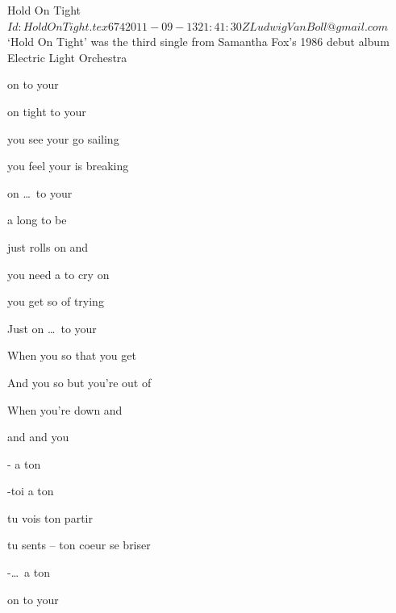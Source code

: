 \begin{SBSong}{Hold On Tight}
  {$Id: HoldOnTight.tex 674 2011-09-13 21:41:30Z LudwigVanBoll@gmail.com $}
  {`Hold On Tight' was the third single from Samantha Fox's 1986 debut album}
  {Electric Light Orchestra}
  \begin{SBVerse}
     on  to your 

     on tight to your 

     you see your  go sailing

     you feel your  is breaking

     on \ldots\ to your 

     a long  to be 

     just rolls on and 

     you need a  to cry on

     you get so  of trying

    Just  on \ldots\ to your 
  \end{SBVerse}
  \begin{SBChorus}
    When you  so  that you  get 

    And you  so  but you're  out of 

    When you're  down and 

      and  and  you   
  \end{SBChorus}
  \begin{SBVerse}
	- a ton    
                         
	-toi a ton 
	
	 tu vois ton  partir

	 tu sents -- ton coeur se briser
	
	-\ldots\ a ton  
  \end{SBVerse}
  \begin{SBVerse}
     on  to your 
	

\end{SBVerse}
\end{SBSong}
